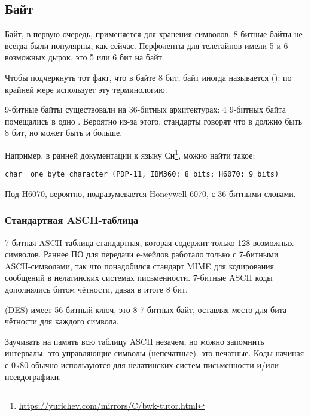 \subsection{Байт}

Байт, в первую очередь, применяется для хранения символов.
8-битные байты не всегда были популярны, как сейчас.
Перфоленты для телетайпов имели 5 и 6 возможных дырок, это 5 или 6 бит на байт.

Чтобы подчеркнуть тот факт, что в байте 8 бит, байт иногда называется  ():
по крайней мере  использует эту терминологию.

9-битные байты существовали на 36-битных архитектурах: 4 9-битных байта помещались в одно .
Вероятно из-за этого, стандарты \CCpp говорят что в  должно быть  8 бит, но может быть и больше.

Например, в ранней документации к языку Си\footnote{\url{https://yurichev.com/mirrors/C/bwk-tutor.html}}, можно найти такое:

\begin{lstlisting}
char  one byte character (PDP-11, IBM360: 8 bits; H6070: 9 bits) 
\end{lstlisting}

Под H6070, вероятно, подразумевается Honeywell 6070, с 36-битными словами.

\subsubsection{Стандартная ASCII-таблица}

7-битная ASCII-таблица стандартная, которая содержит только 128 возможных символов.
Раннее ПО для передачи е-мейлов работало только с 7-битными ASCII-символами, так что понадобился стандарт \ac{MIME}
для кодирования сообщений в нелатинских системах письменности.
7-битные ASCII коды дополнялись битом чётности, давая в итоге 8 бит.

 (\ac{DES}) имеет 56-битный ключ, это 8 7-битных байт,
оставляя место для бита чётности для каждого символа.

Заучивать на память всю таблицу \ac{ASCII} незачем, но можно запомнить интервалы.
 это управляющие символы (непечатные).
 это печатные.
Коды начиная с 0x80 обычно используются для нелатинских систем письменности и/или псевдографики.

